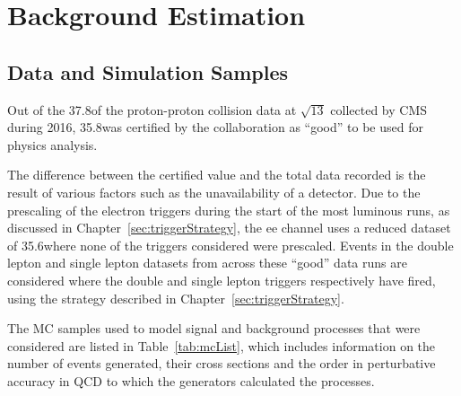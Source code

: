 \chapter{Background Estimation}\label{chapter:bkg}
%
%
%
%

\section{Data and Simulation Samples}\label{sec:samples}
Out of the 37.8\fbinv of the proton-proton collision data at $\sqrt{13}$ collected by CMS during 2016, 35.8\fbinv was certified by the collaboration as ``good'' to be used for physics analysis.

The difference between the certified value and the total data recorded is the result of various factors such as the unavailability of a detector.
Due to the prescaling of the electron triggers during the start of the most luminous runs, as discussed in Chapter~\ref{sec:triggerStrategy}, the ee channel uses a reduced dataset of 35.6\fbinv where none of the triggers considered were prescaled.
Events in the double lepton and single lepton datasets from across these ``good'' data runs are considered where the double and single lepton triggers respectively have fired, using the strategy described in Chapter~\ref{sec:triggerStrategy}.

The MC samples used to model signal and background processes that were considered are listed in Table~\ref{tab:mcList}, which includes information on the number of events generated, their cross sections and the order in perturbative accuracy in QCD to which the generators calculated the processes.

